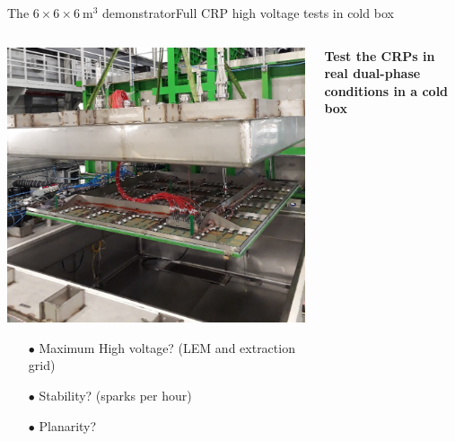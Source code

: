 \documentclass[10pt]{beamer}
\begin{document}
    \begin{frame}{The \texorpdfstring{$6 \times 6 \times \SI{6}{\meter\cubed}$}{666} demonstrator}{Full CRP high voltage  tests in cold box}
   		\begin{columns}
   			\begin{column}{0.35\textwidth}
   				\includegraphics[width=\textwidth]{figures/666/crp_inserting_coldbox.png}\\
   				\begin{scriptsize}
   					\begin{itemize}
   						\item[$\bullet$] Maximum High voltage? (LEM and extraction grid)
   						\item[$\bullet$] Stability? (sparks per hour)
   						\item[$\bullet$] Planarity?
   					\end{itemize}
   				\end{scriptsize}
    		\end{column}
    		\begin{column}{0.65\textwidth}
    			\begin{scriptsize}
	    			\textbf{Test the CRPs in real dual-phase conditions in a cold box}
	    		\end{scriptsize}
    			\begin{tiny}
    				\begin{table}[]
    					\begin{scriptsize}

\end{scriptsize}
\end{table}
\end{tiny}
\end{column}
\end{columns}
\end{frame}
\end{document}
